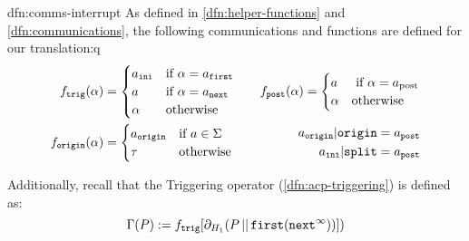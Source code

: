 \documentclass[../hons_project.tex]{subfiles}
\begin{document}
\begin{dfn}{dfn:comms-interrupt}{}
	As defined in \ref{dfn:helper-functions} and \ref{dfn:communications}, the following communications and functions are defined for our translation:q
	\begin{align*}
		f_{\mathtt{trig}}(\alpha)             & = \begin{cases}
			                                          a_{\mathtt{ini}} & \text{if } \alpha = a_{\mathtt{first}} \\
			                                          a                & \text{if } \alpha = a_{\mathtt{next}}  \\
			                                          \alpha           & \text{otherwise}
		                                          \end{cases} \quad
											  &f_{\mathtt{post}}(\alpha)             = \begin{cases}
			                                          a      & \text{ if } \alpha = a_{\mathrm{post}} \\
			                                          \alpha & \text{otherwise}
		                                          \end{cases}                                                                    \\
		\fdef{origin}(\alpha)                 & = \begin{cases}
			                                          a_{\mathtt{origin}} & \text{if } a\in\Sigma \\
			                                          \tau                & \text{otherwise}
		                                          \end{cases}\quad
											  &\begin{split}
		    a_{\mathtt{origin}} | \mathtt{origin} &= a_{\mathtt{post}} \\ a_{\mathtt{ini}} | \mathtt{split} &= a_{\mathtt{post}}
		\end{split}
	\end{align*}

	\longrule{0.08ex}

	Additionally, recall that the Triggering operator (\ref{dfn:acp-triggering}) is defined as:
	\[\Gamma(P) := f_{\mathtt{trig}}[\partial_{H_{1}}(P \merge \mathtt{first}(\mathtt{next}^{\infty}))])\]
\end{dfn}
\end{document}
